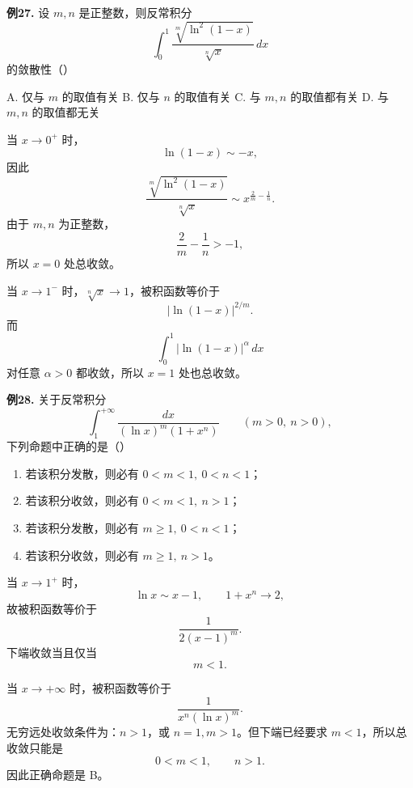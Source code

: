 \begin{problemblock}
\textbf{例27.} 设 \(m,n\) 是正整数，则反常积分
\[
\int_0^1
\frac{\sqrt[m]{\ln^2(1-x)}}{\sqrt[n]{x}}\,dx
\]
的敛散性（\quad）

A. 仅与 \(m\) 的取值有关\qquad
B. 仅与 \(n\) 的取值有关\qquad
C. 与 \(m,n\) 的取值都有关\qquad
D. 与 \(m,n\) 的取值都无关
\end{problemblock}
\begin{solutionblock}
当 \(x\to0^+\) 时，
\[
\ln(1-x)\sim -x,
\]
因此
\[
\frac{\sqrt[m]{\ln^2(1-x)}}{\sqrt[n]{x}}
\sim x^{\frac2m-\frac1n}.
\]
由于 \(m,n\) 为正整数，
\[
\frac2m-\frac1n>-1,
\]
所以 \(x=0\) 处总收敛。

当 \(x\to1^-\) 时，\(\sqrt[n]{x}\to1\)，被积函数等价于
\[
|\ln(1-x)|^{2/m}.
\]
而
\[
\int_0^1|\ln(1-x)|^\alpha\,dx
\]
对任意 \(\alpha>0\) 都收敛，所以 \(x=1\) 处也总收敛。
\end{solutionblock}

\begin{problemblock}
\textbf{例28.} 关于反常积分
\[
\int_1^{+\infty}
\frac{dx}{(\ln x)^m(1+x^n)}
\qquad (m>0,\ n>0),
\]
下列命题中正确的是（\quad）
\begin{enumerate}[label=\Alph*., leftmargin=2.2em]
\item 若该积分发散，则必有 \(0<m<1,\ 0<n<1\)；
\item 若该积分收敛，则必有 \(0<m<1,\ n>1\)；
\item 若该积分发散，则必有 \(m\ge1,\ 0<n<1\)；
\item 若该积分收敛，则必有 \(m\ge1,\ n>1\)。
\end{enumerate}
\end{problemblock}
\begin{solutionblock}
当 \(x\to1^+\) 时，
\[
\ln x\sim x-1,\qquad 1+x^n\to2,
\]
故被积函数等价于
\[
\frac{1}{2(x-1)^m}.
\]
下端收敛当且仅当
\[
m<1.
\]

当 \(x\to+\infty\) 时，被积函数等价于
\[
\frac{1}{x^n(\ln x)^m}.
\]
无穷远处收敛条件为：\(n>1\)，或 \(n=1,m>1\)。但下端已经要求 \(m<1\)，所以总收敛只能是
\[
0<m<1,\qquad n>1.
\]
因此正确命题是 B。
\end{solutionblock}

